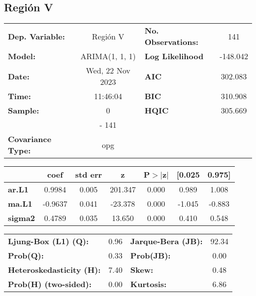 \documentclass{article}%
\begin{document}
\subsection*{Región V}%
\begin{center}
\begin{tabular}{lclc}
\toprule
\textbf{Dep. Variable:}          &     Región V     & \textbf{  No. Observations:  } &    141      \\
\textbf{Model:}                  &  ARIMA(1, 1, 1)  & \textbf{  Log Likelihood     } &  -148.042   \\
\textbf{Date:}                   & Wed, 22 Nov 2023 & \textbf{  AIC                } &  302.083    \\
\textbf{Time:}                   &     11:46:04     & \textbf{  BIC                } &  310.908    \\
\textbf{Sample:}                 &        0         & \textbf{  HQIC               } &  305.669    \\
\textbf{}                        &       - 141      & \textbf{                     } &             \\
\textbf{Covariance Type:}        &       opg        & \textbf{                     } &             \\
\bottomrule
\end{tabular}
\begin{tabular}{lcccccc}
                & \textbf{coef} & \textbf{std err} & \textbf{z} & \textbf{P$> |$z$|$} & \textbf{[0.025} & \textbf{0.975]}  \\
\midrule
\textbf{ar.L1}  &       0.9984  &        0.005     &   201.347  &         0.000        &        0.989    &        1.008     \\
\textbf{ma.L1}  &      -0.9637  &        0.041     &   -23.378  &         0.000        &       -1.045    &       -0.883     \\
\textbf{sigma2} &       0.4789  &        0.035     &    13.650  &         0.000        &        0.410    &        0.548     \\
\bottomrule
\end{tabular}
\begin{tabular}{lclc}
\textbf{Ljung-Box (L1) (Q):}     & 0.96 & \textbf{  Jarque-Bera (JB):  } & 92.34  \\
\textbf{Prob(Q):}                & 0.33 & \textbf{  Prob(JB):          } &  0.00  \\
\textbf{Heteroskedasticity (H):} & 7.40 & \textbf{  Skew:              } &  0.48  \\
\textbf{Prob(H) (two-sided):}    & 0.00 & \textbf{  Kurtosis:          } &  6.86  \\
\bottomrule
\end{tabular}
\end{center}
\end{document}
